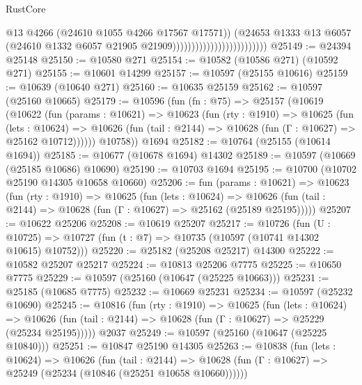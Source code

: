 \begin{lexlean}{RustCore}
\begin{coremodule}
                                                    @13
                                                    @4266
                                                    (@24610 @1055 @4266 @17567 @17571))
                                                  (@24653
                                                    @1333
                                                    @13
                                                    @6057
                                                    (@24610
                                                      @1332
                                                      @6057
                                                      @21905
                                                      @21909)))))))))))))))))))))))))
@25149 := @24394 @25148
@25150 := @10580 @271
@25154 := @10582 (@10586 @271) (@10592 @271)
@25155 := @10601 @14299
@25157 := @10597 (@25155 @10616)
@25159 := @10639 (@10640 @271)
@25160 := @10635 @25159
@25162 := @10597 (@25160 @10665)
@25179 := @10596
    (fun (fn : @75) =>
    @25157
      (@10619
        (@10622
          (fun (params : @10621) =>
          @10623
            (fun (rty : @1910) =>
            @10625
              (fun (lets : @10624) =>
              @10626 (fun (tail : @2144) => @10628 (fun (Γ : @10627) => @25162 @10712))))))
        @10758))
    @1694
@25182 := @10764 (@25155 (@10614 @1694))
@25185 := @10677 (@10678 @1694) @14302
@25189 := @10597 (@10669 (@25185 @10686) @10690)
@25190 := @10703 @1694
@25195 := @10700 (@10702 @25190 @14305 @10658 @10660)
@25206 := fun (params : @10621) =>
  @10623
    (fun (rty : @1910) =>
    @10625
      (fun (lets : @10624) =>
      @10626 (fun (tail : @2144) => @10628 (fun (Γ : @10627) => @25162 (@25189 @25195)))))
@25207 := @10622 @25206
@25208 := @10619 @25207
@25217 := @10726
    (fun (U : @10725) => @10727 (fun (t : @7) => @10735 (@10597 (@10741 @14302 @10615) @10752)))
@25220 := @25182 (@25208 @25217) @14300
@25222 := @10582 @25207 @25217
@25224 := @10813 @25206 @7775
@25225 := @10650 @7775
@25229 := @10597 (@25160 (@10647 (@25225 @10663)))
@25231 := @25185 (@10685 @7775)
@25232 := @10669 @25231
@25234 := @10597 (@25232 @10690)
@25245 := @10816
    (fun (rty : @1910) =>
    @10625
      (fun (lets : @10624) =>
      @10626 (fun (tail : @2144) => @10628 (fun (Γ : @10627) => @25229 (@25234 @25195)))))
    @2037
@25249 := @10597 (@25160 (@10647 (@25225 @10840)))
@25251 := @10847 @25190 @14305
@25263 := @10838
    (fun (lets : @10624) =>
    @10626
      (fun (tail : @2144) =>
      @10628 (fun (Γ : @10627) => @25249 (@25234 (@10846 (@25251 @10658 @10660))))))

\end{coremodule}
\end{lexlean}
